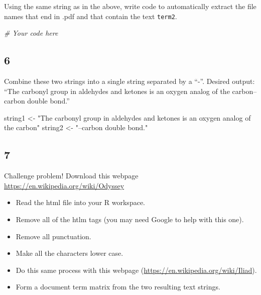 \documentclass[]{book}
\newenvironment{Shaded}{\begin{snugshade}}{\end{snugshade}}
\newcommand{\StringTok}[1]{\textcolor[rgb]{0.31,0.60,0.02}{#1}}
\newcommand{\CommentTok}[1]{\textcolor[rgb]{0.56,0.35,0.01}{\textit{#1}}}
\newcommand{\NormalTok}[1]{#1}
\providecommand{\tightlist}{%
  \setlength{\itemsep}{0pt}\setlength{\parskip}{0pt}}
\theoremstyle{definition}
\theoremstyle{definition}
\theoremstyle{definition}
\theoremstyle{remark}
\begin{document}
Using the same string as in the above, write code to automatically
extract the file names that end in .pdf and that contain the text
\texttt{term2}.

\begin{Shaded}
\begin{Highlighting}[]
\CommentTok{# Your code here}
\end{Highlighting}
\end{Shaded}

\subsection*{6}\label{section-22}

Combine these two strings into a single string separated by a ``-''.
Desired output: ``The carbonyl group in aldehydes and ketones is an
oxygen analog of the carbon--carbon double bond.''

\begin{Shaded}
\begin{Highlighting}[]
\NormalTok{string1 <-}\StringTok{ "The carbonyl group in aldehydes and ketones }
\StringTok{            is an oxygen analog of the carbon"} 
\NormalTok{string2 <-}\StringTok{  "–carbon double bond."}
\end{Highlighting}
\end{Shaded}

\subsection*{7}\label{section-23}

Challenge problem! Download this webpage
\url{https://en.wikipedia.org/wiki/Odyssey}

\begin{itemize}
\tightlist
\item
  Read the html file into your R workspace.
\item
  Remove all of the htlm tags (you may need Google to help with this
  one).
\item
  Remove all punctuation.
\item
  Make all the characters lower case.
\item
  Do this same process with this webpage
  (\url{https://en.wikipedia.org/wiki/Iliad}).
\item
  Form a document term matrix from the two resulting text strings.
\end{itemize}
\end{document}
